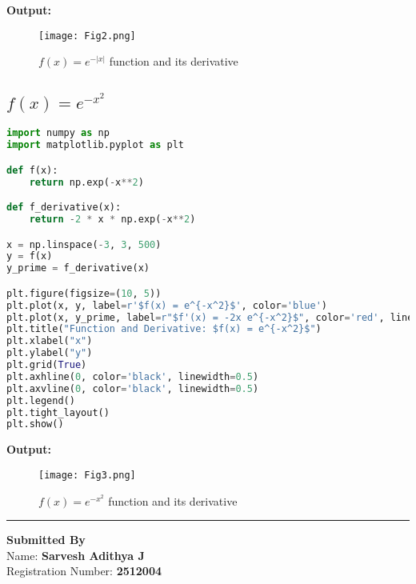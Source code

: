 \documentclass[11pt]{article}
\begin{document}
\noindent\textbf{Output:}
\begin{figure}[H]
    \centering
    \texttt{[image: Fig2.png]}
    \caption{$f(x) = e^{-|x|}$ function and its derivative}
\end{figure}

\subsection{$f(x) = e^{-x^2}$}

\begin{lstlisting}[language=Python, caption={$f(x) = e^{-x^2}$ and its derivative}]
import numpy as np
import matplotlib.pyplot as plt

def f(x):
    return np.exp(-x**2)

def f_derivative(x):
    return -2 * x * np.exp(-x**2)

x = np.linspace(-3, 3, 500)
y = f(x)
y_prime = f_derivative(x)

plt.figure(figsize=(10, 5))
plt.plot(x, y, label=r'$f(x) = e^{-x^2}$', color='blue')
plt.plot(x, y_prime, label=r"$f'(x) = -2x e^{-x^2}$", color='red', linestyle='--')
plt.title("Function and Derivative: $f(x) = e^{-x^2}$")
plt.xlabel("x")
plt.ylabel("y")
plt.grid(True)
plt.axhline(0, color='black', linewidth=0.5)
plt.axvline(0, color='black', linewidth=0.5)
plt.legend()
plt.tight_layout()
plt.show()
\end{lstlisting}

\noindent\textbf{Output:}
\begin{figure}[H]
    \centering
    \texttt{[image: Fig3.png]}
    \caption{$f(x) = e^{-x^2}$ function and its derivative}
\end{figure}

\vspace{2em}
\hrule
\vspace{1em}

\begin{center}
\textbf{Submitted By} \\
\vspace{0.5em}
Name: \textbf{Sarvesh Adithya J} \\
Registration Number: \textbf{2512004}
\end{center}
\end{document}
